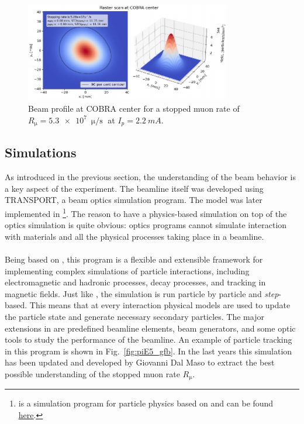 \begin{refsection}
        \begin{figure}
            \centering
            \includegraphics[width = 0.8\textwidth]{Figures/MEG/meg_beamprofile.png}
            \caption[$\pi E5$: beam at COBRA center]{Beam profile at COBRA center for a stopped muon rate of $R_\upmu = \SI{5.3e7}{\upmu \per \second}$ at $I_p = \SI{2.2}{mA}$.}
            \label{fig:meg:beamprofile}
        \end{figure}

    \subsection{Simulations}
        As introduced in the previous section, the understanding of the beam behavior is a key aspect of the experiment.
        The beamline itself was developed using TRANSPORT, a beam optics simulation program.
        The model was later implemented in \gfb\footnote{\gfb is a simulation program for particle physics based on \gf and can be found \href{https://www.muonsinc.com/Website1/G4beamline}{\underline{here}}.}.
        The reason to have a physics-based simulation on top of the optics simulation is quite obvious: optics programs cannot simulate interaction with materials and all the physical processes taking place in a beamline.

        
        \paragraph{\gfb} Being based on \gf, this program is a flexible and extensible framework for implementing complex simulations of particle interactions, including electromagnetic and hadronic processes, decay processes, and tracking in magnetic fields.
        Just like \gf, the simulation is run particle by particle and \textit{step}-based.
        This means that at every interaction physical models are used to update the particle state and generate necessary secondary particles.
        The major extensions in \gfb are predefined beamline elements, beam generators, and some optic tools to study the performance of the beamline.
        An example of particle tracking in this program is shown in Fig.~\ref{fig:piE5_gfb}.
        In the last years this simulation has been updated and developed by Giovanni Dal Maso to extract the best possible understanding of the stopped muon rate $R_\upmu$. 


\end{refsection}
